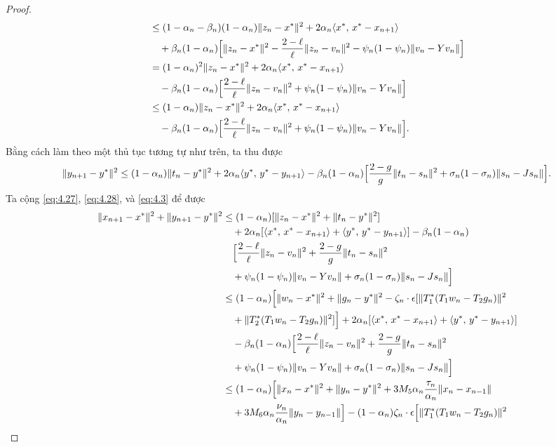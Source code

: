 \documentclass[11pt,a4paper]{article}
\theoremstyle{plain}
\theoremstyle{definition}
\theoremstyle{remark}
\numberwithin{equation}{section}
\newcommand{\inp}[2]{\langle #1,\,#2\rangle}
\newcommand{\nm}[1]{\lVert #1\rVert}
\begin{document}
\begin{proof}
\begin{align}
&\le (1-\alpha_n-\beta_n)(1-\alpha_n)\nm{z_n-x^{*}}^2+2\alpha_n\inp{x^{*}}{x^{*}-x_{n+1}}\notag\\
&\quad +\beta_n(1-\alpha_n)\Bigl[\nm{z_n-x^{*}}^2-\frac{2-\ell}{\ell}\nm{z_n-v_n}^2-\psi_n(1-\psi_n)\nm{v_n-Yv_n}\Bigr]\notag\\
&= (1-\alpha_n)^2\nm{z_n-x^{*}}^2+2\alpha_n\inp{x^{*}}{x^{*}-x_{n+1}}\notag\\
&\quad -\beta_n(1-\alpha_n)\Bigl[\frac{2-\ell}{\ell}\nm{z_n-v_n}^2+\psi_n(1-\psi_n)\nm{v_n-Yv_n}\Bigr]\notag\\
&\le (1-\alpha_n)\nm{z_n-x^{*}}^2+2\alpha_n\inp{x^{*}}{x^{*}-x_{n+1}}\notag\\
&\quad -\beta_n(1-\alpha_n)\Bigl[\frac{2-\ell}{\ell}\nm{z_n-v_n}^2+\psi_n(1-\psi_n)\nm{v_n-Yv_n}\Bigr]. \label{eq:4.27}
\end{align}
Bằng cách làm theo một thủ tục tương tự như trên, ta thu được
\begin{equation}
\nm{y_{n+1}-y^{*}}^2\le(1-\alpha_n)\nm{t_n-y^{*}}^2+2\alpha_n\inp{y^{*}}{y^{*}-y_{n+1}}-\beta_n(1-\alpha_n)\Bigl[\frac{2-g}{g}\nm{t_n-s_n}^2+\sigma_n(1-\sigma_n)\nm{s_n-Js_n}\Bigr]. \label{eq:4.28}
\end{equation}
Ta cộng \eqref{eq:4.27}, \eqref{eq:4.28}, và \eqref{eq:4.3} để được
\begin{align*}
\nm{x_{n+1}-x^{*}}^2+\nm{y_{n+1}-y^{*}}^2 &\le (1-\alpha_n)[\nm{z_n-x^{*}}^2+\nm{t_n-y^{*}}^2]\\
&\quad +2\alpha_n[\inp{x^{*}}{x^{*}-x_{n+1}}+\inp{y^{*}}{y^{*}-y_{n+1}}]-\beta_n(1-\alpha_n)\\
&\quad \Bigl[\frac{2-\ell}{\ell}\nm{z_n-v_n}^2+\frac{2-g}{g}\nm{t_n-s_n}^2\\
&\quad +\psi_n(1-\psi_n)\nm{v_n-Yv_n}+\sigma_n(1-\sigma_n)\nm{s_n-Js_n}\Bigr]\\
&\le (1-\alpha_n)\Bigl[\nm{w_n-x^{*}}^2+\nm{g_n-y^{*}}^2-\zeta_n\cdot\epsilon[\nm{T_1^{*}(T_1w_n-T_2g_n)}^2\\
&\quad +\nm{T_2^{*}(T_1w_n-T_2g_n)}^2]\Bigr]+2\alpha_n[\inp{x^{*}}{x^{*}-x_{n+1}}+\inp{y^{*}}{y^{*}-y_{n+1}}]\\
&\quad -\beta_n(1-\alpha_n)\Bigl[\frac{2-\ell}{\ell}\nm{z_n-v_n}^2+\frac{2-g}{g}\nm{t_n-s_n}^2\\
&\quad +\psi_n(1-\psi_n)\nm{v_n-Yv_n}+\sigma_n(1-\sigma_n)\nm{s_n-Js_n}\Bigr]\\
&\le (1-\alpha_n)\Bigl[\nm{x_n-x^{*}}^2+\nm{y_n-y^{*}}^2+3M_5\alpha_n\frac{\tau_n}{\alpha_n}\nm{x_n-x_{n-1}}\\
&\quad +3M_6\alpha_n\frac{\nu_n}{\alpha_n}\nm{y_n-y_{n-1}}\Bigr]-(1-\alpha_n)\zeta_n\cdot\epsilon\Bigl[\nm{T_1^{*}(T_1w_n-T_2g_n)}^2\\

\end{align*}
\end{proof}
\end{document}
